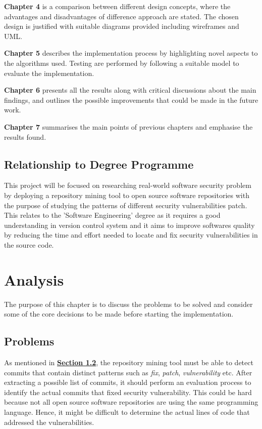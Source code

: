 \documentclass[12pt, a4paper]{report}
\begin{document}
\noindent\textbf{Chapter 4} is a comparison between different design concepts, where the advantages
and disadvantages of difference approach are stated. The chosen design is justified with suitable
diagrams provided including wireframes and UML.

\noindent\textbf{Chapter 5} describes the implementation process by highlighting novel aspects to
the algorithms used. Testing are performed by following a suitable model to evaluate the
implementation.

\noindent\textbf{Chapter 6} presents all the results along with critical discussions about the main
findings,	and outlines the possible improvements that could be made in the future work.

\noindent\textbf{Chapter 7} summarises the main points of previous chapters and emphasise the
results found.

\section{Relationship to Degree Programme}
This project will be focused on researching real-world software security problem by deploying a
repository mining tool to open source software repositories with the purpose of studying the
patterns of different security vulnerabilities patch. This relates to the 'Software Engineering'
degree as it requires a good understanding in version control system and it aims to improve
softwares quality by reducing the time and effort needed to locate and fix security vulnerabilities
in the source code.

\chapter{Analysis}
The purpose of this chapter is to discuss the problems to be solved and consider some of the core
decisions to be made before starting the implementation.

\section{Problems}
As mentioned in \hyperref[sec:objectives]{\textbf{Section 1.2}}, the repository mining tool must be
able to detect commits that contain distinct patterns such as \textit{fix}, \textit{patch},
\textit{vulnerability} etc. After extracting a possible list of commits, it should perform an
evaluation process to identify the actual commits that fixed security vulnerability.	This could be
hard because not all open source software repositories are using the same programming language.
Hence, it might be difficult to determine the actual lines of code that addressed the
vulnerabilities.
\end{document}
